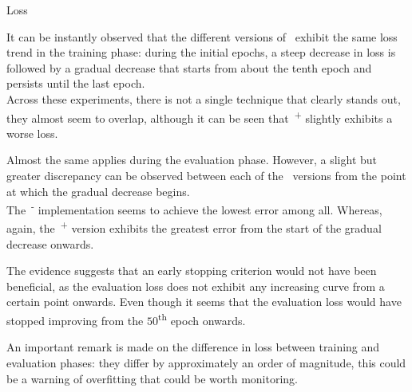 \begin{subsection}{Loss}
    \begin{figure}[h!]
        \centering
        \begin{subfigure}[b]{0.48\textwidth}
            \centering
            
            \label{fig:training_loss}
        \end{subfigure}
        \hfill
        \begin{subfigure}[b]{0.48\textwidth}
            \centering
            
            \label{fig:evaluation_loss}
        \end{subfigure}
    \end{figure}
    \par It can be instantly observed that the different versions of~ exhibit the same loss trend in the training phase: during the initial epochs, a steep decrease in loss is followed by a gradual decrease that starts from about the tenth epoch and persists until the last epoch.\\

    Across these experiments, there is not a single technique that clearly stands out, they almost seem to overlap, although it can be seen that~\textsuperscript{+} slightly exhibits a worse loss.\\
    \par Almost the same applies during the evaluation phase. However, a slight but greater discrepancy can be observed between each of the~ versions from the point at which the gradual decrease begins.\\ The~\textsuperscript{-} implementation seems to achieve the lowest error among all. Whereas, again, the~\textsuperscript{+} version exhibits the greatest error from the start of the gradual decrease onwards.
    \par The evidence suggests that an early stopping criterion would not have been beneficial, as the evaluation loss does not exhibit any increasing curve from a certain point onwards. Even though it seems that the evaluation loss would have stopped improving from the $50$\textsuperscript{th} epoch onwards.\\

    \par An important remark is made on the difference in loss between training and evaluation phases: they differ by approximately an order of magnitude, this could be a warning of overfitting that could be worth monitoring.
\end{subsection}
\clearpage
